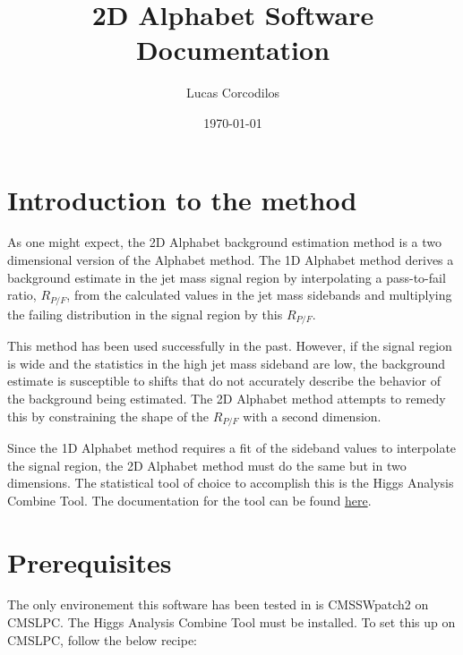 \documentclass[letter]{article}
\title{2D Alphabet Software Documentation}
\author{Lucas Corcodilos}
\date{\today}
\begin{document}
\maketitle
\titlespacing{\section}{0pt}{5pt}{0pt}
\titlespacing{\subsection}{0pt}{5pt}{0pt}
\titlespacing{\subsubsection}{0pt}{5pt}{0pt}
\setlength{\parskip}{1em}

\section{Introduction to the method}
    As one might expect, the 2D Alphabet background estimation method is a two dimensional version of the Alphabet method. The 1D Alphabet method derives a background estimate in the jet mass signal region by interpolating a pass-to-fail ratio, $R_{P/F}$, from the calculated values in the jet mass sidebands and multiplying the failing distribution in the signal region by this $R_{P/F}$. 

    This method has been used successfully in the past. However, if the signal region is wide and the statistics in the high jet mass sideband are low, the background estimate is susceptible to shifts that do not accurately describe the behavior of the background being estimated. The 2D Alphabet method attempts to remedy this by constraining the shape of the $R_{P/F}$ with a second dimension.

    Since the 1D Alphabet method requires a fit of the sideband values to interpolate the signal region, the 2D Alphabet method must do the same but in two dimensions. The statistical tool of choice to accomplish this is the Higgs Analysis Combine Tool. The documentation for the tool can be found \href{https://cms-hcomb.gitbooks.io/combine/content/}{here}. 


\section{Prerequisites}
    The only environement this software has been tested in is CMSSW\textunderscore patch2 on CMSLPC. The Higgs Analysis Combine Tool must be installed. To set this up on CMSLPC, follow the below recipe:
\end{document}
